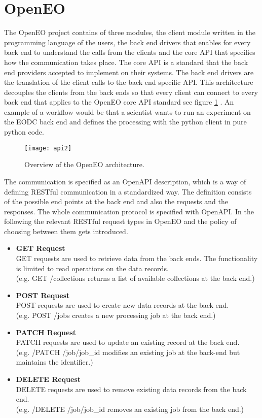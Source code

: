 \documentclass[draft,final]{vutinfth} %
\begin{document}
\section{OpenEO}\label{OpenEO}
The OpenEO project contains of three modules, the client module written in the programming language of the users, the back end drivers that enables for every back end to understand the calls from the clients and the core API that specifies how the communication takes place. The core API is a standard that the back end providers accepted to implement on their systems. The back end drivers are the translation of the client calls to the back end specific API. This architecture decouples the clients from the back ends so that every client can connect to every back end that applies to the OpenEO core API standard see figure \ref{fig:api2} . An example of a workflow would be that a scientist wants to run an experiment on the EODC back end and defines the processing with the python client in pure python code.\cite{openeo}   

\begin{figure}[h]
	\centering
	\texttt{[image: api2]}
	\caption{Overview of the OpenEO architecture. \cite{openeo_github}}
	\label{fig:api2} %
\end{figure}


The communication is specified as an OpenAPI description, which is a way of defining RESTful communication in a standardized way. The definition consists of the possible end points at the back end and also the requests and the responses. The whole communication protocol is specified with OpenAPI.\cite{openapi} 
In the following the relevant RESTful request types in OpenEO and the policy of choosing between them gets introduced.\cite{openeo_github}
 
 \begin{itemize}
 	\item \textbf{GET Request} \\
 	GET requests are used to retrieve data from the back ends. The functionality is limited to read operations on the data records. \\(e.g. GET /collections returns a list of available collections at the back end.)
 	\item \textbf{POST Request} \\ 
 	POST requests are used to create new data records at the back end.  \\(e.g. POST /jobs creates a new processing job at the back end.)  
 	\item \textbf{PATCH Request} \\
 	PATCH requests are used to update an existing record at the back end. \\(e.g. /PATCH /job/{job\_id} modifies an existing job at the back-end but maintains the identifier.)
 	\item \textbf{DELETE Request} \\ 
 	DELETE requests are used to remove existing data records from the back end. \\(e.g. /DELETE /job/{job\_id} removes an existing job from the back end.)
 \end{itemize}
\end{document}
